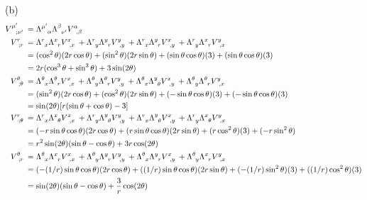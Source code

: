 \message{ !name(gr-ch5-notes.tex)}\documentclass[gr-notes.tex]{subfiles}
\begin{document}
(b)
\begin{align*}
  \tensor{V}{^{\mu'}_{;\nu'}} &=
  \tensor{\Lambda}{^{\mu'}_\alpha}
  \tensor{\Lambda}{^\beta_{\nu'}}
  \tensor{V}{^\alpha_{,\beta}}
  \\
  \tensor{V}{^r_{;r}} &=
  \tensor{\Lambda}{^r_x} \tensor{\Lambda}{^x_r} \tensor{V}{^x_{,x}} +
  \tensor{\Lambda}{^r_y} \tensor{\Lambda}{^y_r} \tensor{V}{^y_{,y}} +
  \tensor{\Lambda}{^r_x} \tensor{\Lambda}{^y_r} \tensor{V}{^x_{,y}} +
  \tensor{\Lambda}{^r_y} \tensor{\Lambda}{^x_r} \tensor{V}{^y_{,x}}
  \\ &=
  (\cos^2\theta) (2r \cos\theta) +
  (\sin^2\theta) (2r \sin\theta) +
  (\sin\theta \cos\theta) (3) +
  (\sin\theta \cos\theta) (3)
  \\ &=
  2r (\cos^3\theta + \sin^3\theta) +
  3 \sin(2\theta)
  \\
  \tensor{V}{^\theta_{;\theta}} &=
  \tensor{\Lambda}{^\theta_x} \tensor{\Lambda}{^\theta_r} \tensor{V}{^x_{,x}} +
  \tensor{\Lambda}{^\theta_y} \tensor{\Lambda}{^\theta_r} \tensor{V}{^y_{,y}} +
  \tensor{\Lambda}{^\theta_x} \tensor{\Lambda}{^y_\theta} \tensor{V}{^x_{,y}} +
  \tensor{\Lambda}{^\theta_y} \tensor{\Lambda}{^\theta_r} \tensor{V}{^y_{,x}}
  \\ &=
  (\sin^2\theta) (2 r \cos\theta) + (\cos^2\theta) (2 r \sin\theta) +
  (-\sin\theta \cos\theta) (3) + (-\sin\theta \cos\theta) (3)
  \\ &=
  \sin(2\theta) [ r (\sin\theta + \cos\theta) - 3 ]
  \\
  \tensor{V}{^r_{;\theta}} &=
  \tensor{\Lambda}{^r_x} \tensor{\Lambda}{^x_\theta} \tensor{V}{^x_{,x}} +
  \tensor{\Lambda}{^r_y} \tensor{\Lambda}{^y_\theta} \tensor{V}{^y_{,y}} +
  \tensor{\Lambda}{^r_x} \tensor{\Lambda}{^y_\theta} \tensor{V}{^x_{,y}} +
  \tensor{\Lambda}{^r_y} \tensor{\Lambda}{^x_\theta} \tensor{V}{^y_{,x}}
  \\ &=
  (-r \sin\theta \cos\theta) (2 r \cos\theta) +
  (r \sin\theta \cos\theta) (2 r \sin\theta) +
  (r \cos^2\theta) (3) + (-r \sin^2\theta)
  \\ &=
  r^2 \sin(2\theta) (\sin\theta - \cos\theta) +
  3 r \cos(2 \theta)
  \\
  \tensor{V}{^\theta_{;r}} &=
  \tensor{\Lambda}{^\theta_x} \tensor{\Lambda}{^x_r} \tensor{V}{^x_{,x}} +
  \tensor{\Lambda}{^\theta_y} \tensor{\Lambda}{^y_r} \tensor{V}{^y_{,y}} +
  \tensor{\Lambda}{^\theta_x} \tensor{\Lambda}{^y_r} \tensor{V}{^x_{,y}} +
  \tensor{\Lambda}{^\theta_y} \tensor{\Lambda}{^x_r} \tensor{V}{^y_{,x}}
  \\ &=
  (-(1/r) \sin\theta \cos\theta) (2 r \cos\theta) +
  ( (1/r) \sin\theta \cos\theta) (2 r \sin\theta) +
  (-(1/r) \sin^2\theta) (3) +
  ( (1/r) \cos^2\theta) (3)
  \\ &=
  \sin(2\theta) (\sin\theta - \cos\theta) +
  \frac{3}{r} \cos(2 \theta)
\end{align*}
\end{document}
